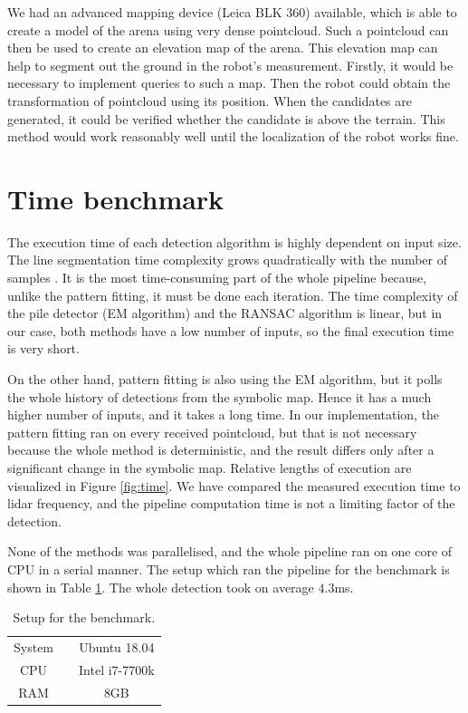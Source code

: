 We had an advanced mapping device (Leica BLK 360) available, which is able to create a model of the arena using very dense pointcloud. Such a pointcloud can then be used to create an elevation map of the arena. This elevation map can help to segment out the ground in the robot's measurement. Firstly, it would be necessary to implement queries to such a map. Then the robot could obtain the transformation of pointcloud using its position. When the candidates are generated, it could be verified whether the candidate is above the terrain. This method would work reasonably well until the localization of the robot works fine.

\section{Time benchmark}
The execution time of each detection algorithm is highly dependent on input size. The line segmentation time complexity grows quadratically with the number of samples \cite{hershberger2000}. It is the most time-consuming part of the whole pipeline because, unlike the pattern fitting, it must be done each iteration. The time complexity of the pile detector (EM algorithm) and the RANSAC algorithm is linear, but in our case, both methods have a low number of inputs, so the final execution time is very short. 

On the other hand, pattern fitting is also using the EM algorithm, but it polls the whole history of detections from the symbolic map. Hence it has a much higher number of inputs, and it takes a long time. In our implementation, the pattern fitting ran on every received pointcloud, but that is not necessary because the whole method is deterministic, and the result differs only after a significant change in the symbolic map. Relative lengths of execution are visualized in Figure \ref{fig:time}. We have compared the measured execution time to lidar frequency, and the pipeline computation time is not a limiting factor of the detection.

None of the methods was parallelised, and the whole pipeline ran on one core of CPU in a serial manner. The setup which ran the pipeline for the benchmark is shown in Table \ref{tab:benchmark}. The whole detection took on average $4.3$ms.

\begin{table}[H]
	\centering
	\caption{Setup for the benchmark.}
	\begin{tabular}{ccc}
		\toprule
		System &\quad& Ubuntu 18.04 \\
		CPU &\quad& Intel i7-7700k  \\
		RAM &\quad& 8GB \\
		\bottomrule
	\end{tabular}
	\label{tab:benchmark}
\end{table}

